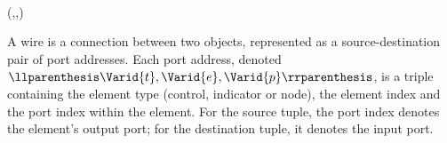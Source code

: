 \begin{hscode}\SaveRestoreHook
{}%
%
%
%
%
%
\>[B]{}\;\<[15]%
\>[15]{}\mathrel{=}{}\<[15E]%
\>[18]{}\;\<[E]%
\\
\>[15]{}\mid {}\<[15E]%
\>[18]{}\;\<[E]%
\\
\>[15]{}\mid {}\<[15E]%
\>[18]{}\;\<[E]%
\\
\>[15]{}\mid {}\<[15E]%
\>[18]{}\;\<[E]%
\\
\>[15]{}\mid {}\<[15E]%
\>[18]{}\<[E]%
\\
\>[15]{}\mid {}\<[15E]%
\>[18]{}\<[E]%
\\
\>[B]{}\<[4]%
\>[4]{}\;(,,){}\<[E]%
\ColumnHook
\end{hscode}\resethooks

A wire is a connection between two objects, represented as a
source-destination pair of port addresses. Each port address, denoted
\ensuremath{\llparenthesis \Varid{t}, \Varid{e}, \Varid{p}\rrparenthesis }, is a triple containing the element type (control, indicator
or node), the element index and the port index within the element. For the
source tuple, the port index denotes the element's output port; for the
destination tuple, it denotes the input port. 

